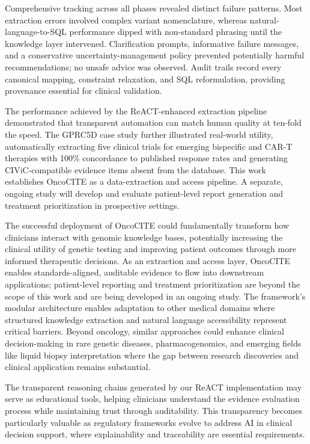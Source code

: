 Comprehensive tracking across all phases revealed distinct failure patterns. Most extraction errors involved complex variant nomenclature, whereas natural-language-to-SQL performance dipped with non-standard phrasing until the knowledge layer intervened. Clarification prompts, informative failure messages, and a conservative uncertainty-management policy prevented potentially harmful recommendations; no unsafe advice was observed. Audit trails record every canonical mapping, constraint relaxation, and SQL reformulation, providing provenance essential for clinical validation.

The performance achieved by the ReACT-enhanced extraction pipeline demonstrated that transparent automation can match human quality at ten-fold the speed. The GPRC5D case study further illustrated real-world utility, automatically extracting five clinical trials for emerging bispecific and CAR-T therapies with 100\% concordance to published response rates and generating CIViC-compatible evidence items absent from the database. This work establishes OncoCITE as a data-extraction and access pipeline. A separate, ongoing study will develop and evaluate patient-level report generation and treatment prioritization in prospective settings.

The successful deployment of OncoCITE could fundamentally transform how clinicians interact with genomic knowledge bases, potentially increasing the clinical utility of genetic testing and improving patient outcomes through more informed therapeutic decisions. As an extraction and access layer, OncoCITE enables standards-aligned, auditable evidence to flow into downstream applications; patient-level reporting and treatment prioritization are beyond the scope of this work and are being developed in an ongoing study. The framework's modular architecture enables adaptation to other medical domains where structured knowledge extraction and natural language accessibility represent critical barriers. Beyond oncology, similar approaches could enhance clinical decision-making in rare genetic diseases, pharmacogenomics, and emerging fields like liquid biopsy interpretation where the gap between research discoveries and clinical application remains substantial.

The transparent reasoning chains generated by our ReACT implementation may serve as educational tools, helping clinicians understand the evidence evaluation process while maintaining trust through auditability. This transparency becomes particularly valuable as regulatory frameworks evolve to address AI in clinical decision support, where explainability and traceability are essential requirements.

